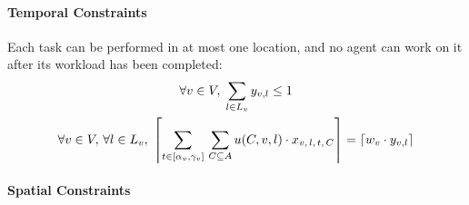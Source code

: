 \paragraph{Temporal Constraints}

Each task can be performed in at most one location, and no agent can work on it after its
workload has been completed:
\begin{gather}
    \forall v \in V,\; \sum_{l \in L_v} y_{v, l} \leq 1\label{eq:mbip2a}\\
    \forall v \in V,\, \forall l \in L_v,\;
    \left\lceil \sum_{t \in [\alpha_v, \gamma_v]}\, \sum_{C \subseteq A} u(C, v, l)
    \cdot x_{v,\, l,\, t,\, C} \right\rceil
    = \left\lceil w_v \cdot y_{v, l} \right\rceil\label{eq:mbip2b}
\end{gather}

\paragraph{Spatial Constraints}


